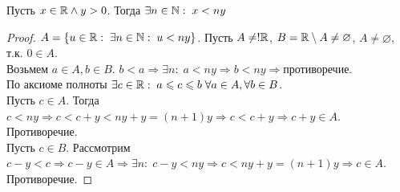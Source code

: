 \begin{theorem}
    Пусть $x \in \mathbb{R} \land y > 0$. Тогда  $\exists n \in \mathbb{N}:\; x < ny$
\end{theorem}
\begin{proof}
    $A = \{u \in \mathbb{R}:\; \exists n \in \mathbb{N}:\; u < ny\}$. Пусть $A \neq! \mathbb{R}$, $B = \mathbb{R} \setminus A \neq \varnothing$,  $A \neq \varnothing$, т.к.  $0 \in A$.\\
    Возьмем  $a \in A, b \in B$.  $b < a \Rightarrow \exists n: \; a < ny \Rightarrow b < ny \Rightarrow \texttt{противоречие}$. \\
    По аксиоме полноты $\exists c \in \mathbb{R}: \; a \leqslant c \leqslant b \; \forall a \in A, \forall b \in B$.  \\
    Пусть $c \in A$. Тогда  $c < ny \Rightarrow c < c + y < ny + y = (n+1)y \Rightarrow c < c + y \Rightarrow c + y \in A$. Противоречие. \\
    Пусть  $c \in B$.  Рассмотрим $c-y<c \Rightarrow c-y \in A \Rightarrow \exists n: \; c - y < ny \Rightarrow c < ny + y = (n+1)y \Rightarrow c \in A$. Противоречие.
\end{proof}
